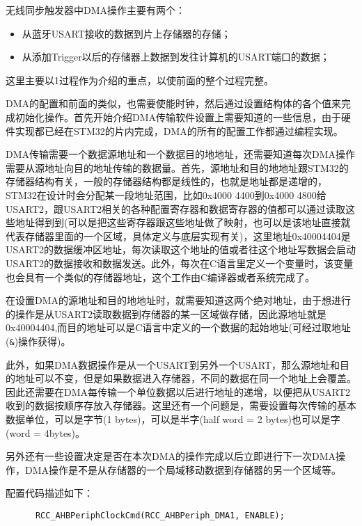 无线同步触发器中DMA操作主要有两个：
\begin{itemize}
\item	从蓝牙USART接收的数据到片上存储器的存储；
\item	从添加Trigger以后的存储器上数据到发往计算机的USART端口的数据；
\end{itemize}

这里主要以1过程作为介绍的重点，以使前面的整个过程完整。

	DMA的配置和前面的类似，也需要使能时钟，然后通过设置结构体的各个值来完成初始化操作。首先开始介绍DMA传输软件设置上需要知道的一些信息，由于硬件实现都已经在STM32的片内完成，DMA的所有的配置工作都通过编程实现。

	DMA传输需要一个数据源地址和一个数据目的地地址，还需要知道每次DMA操作需要从源地址向目的地址传输的数据量。首先，源地址和目的地地址跟STM32的存储器结构有关，一般的存储器结构都是线性的，也就是地址都是递增的，STM32在设计时会分配某一段地址范围，比如0x4000 4400到0x4000 4800给USART2，跟USART2相关的各种配置寄存器和数据寄存器的值都可以通过读取这些地址得到到(可以是把这些寄存器跟这些地址做了映射，也可以是该地址直接就代表存储器里面的一个区域，具体定义与底层实现有关)，这里地址0x40004404是USART2的数据缓冲区地址，每次读取这个地址的值或者往这个地址写数据会启动USART2的数据接收和数据发送。此外，每次在C语言里定义一个变量时，该变量也会具有一个类似的存储器地址，这个工作由C编译器或者系统完成了。

	在设置DMA的源地址和目的地地址时，就需要知道这两个绝对地址，由于想进行的操作是从USART2读取数据到存储器的某一区域做存储，因此源地址就是0x40004404,而目的地址可以是C语言中定义的一个数据的起始地址(可经过取地址(\verb|&|)操作获得)。

	此外，如果DMA数据操作是从一个USART到另外一个USART，那么源地址和目的地址可以不变，但是如果数据进入存储器，不同的数据在同一个地址上会覆盖。因此还需要在DMA每传输一个单位数据以后进行地址的递增，以便把从USART2收到的数据按顺序存放入存储器。这里还有一个问题是，需要设置每次传输的基本数据单位，可以是字节(1 bytes)，可以是半字(half word = 2 bytes)也可以是字(word = 4bytes)。

	另外还有一些设置决定是否在本次DMA的操作完成以后立即进行下一次DMA操作，DMA操作是不是从存储器的一个局域移动数据到存储器的另一个区域等。

配置代码描述如下：

\textit{\color{blue}{//使能DMA1的时钟}}

\verb|   	RCC_AHBPeriphClockCmd(RCC_AHBPeriph_DMA1, ENABLE);|

\textit{\color{blue}{//恢复DMA设置到默认值}}

